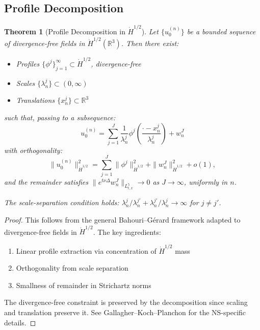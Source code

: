\documentclass[11pt]{article}
\newtheorem{theorem}{Theorem}[section]
\theoremstyle{definition}
\newcommand{\R}{\mathbb{R}}
\begin{document}
\subsection{Profile Decomposition}

\begin{theorem}[Profile Decomposition in $\dot{H}^{1/2}$]\label{thm:profile}
Let $\{u_0^{(n)}\}$ be a bounded sequence of divergence-free fields in $\dot{H}^{1/2}(\R^3)$. Then there exist:
\begin{itemize}
\item Profiles $\{\phi^j\}_{j=1}^\infty \subset \dot{H}^{1/2}$, divergence-free
\item Scales $\{\lambda_n^j\} \subset (0,\infty)$
\item Translations $\{x_n^j\} \subset \R^3$
\end{itemize}
such that, passing to a subsequence:
\begin{equation}
u_0^{(n)} = \sum_{j=1}^{J} \frac{1}{\lambda_n^j} \phi^j\left(\frac{\cdot - x_n^j}{\lambda_n^j}\right) + w_n^J
\end{equation}
with orthogonality:
\begin{equation}
\|u_0^{(n)}\|_{\dot{H}^{1/2}}^2 = \sum_{j=1}^{J} \|\phi^j\|_{\dot{H}^{1/2}}^2 + \|w_n^J\|_{\dot{H}^{1/2}}^2 + o(1),
\end{equation}
and the remainder satisfies $\|e^{t\nu\Delta} w_n^J\|_{L^5_{t,x}} \to 0$ as $J \to \infty$, uniformly in $n$.

The scale-separation condition holds: $\lambda_n^j/\lambda_n^{j'} + \lambda_n^{j'}/\lambda_n^j \to \infty$ for $j \neq j'$.
\end{theorem}

\begin{proof}
This follows from the general Bahouri--G\'erard \cite{BG} framework adapted to divergence-free fields in $\dot{H}^{1/2}$. The key ingredients:
\begin{enumerate}
\item Linear profile extraction via concentration of $\dot{H}^{1/2}$ mass
\item Orthogonality from scale separation
\item Smallness of remainder in Strichartz norms
\end{enumerate}

The divergence-free constraint is preserved by the decomposition since scaling and translation preserve it. See Gallagher--Koch--Planchon \cite{GKP} for the NS-specific details.
\end{proof}
\end{document}
